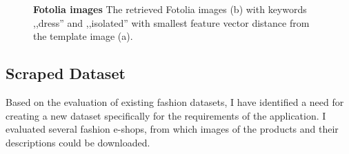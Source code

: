 \documentclass[12pt]{report}
\begin{document}
\begin{figure}[t]
\centering
{}\hspace{1cm}
\caption{\label{fig:fotolia} \textbf{Fotolia images} The retrieved Fotolia images (b) with keywords ,,dress'' and ,,isolated'' with smallest feature vector distance from the template image (a).}
\end{figure}

\pagebreak
\subsection{Scraped Dataset}
Based on the evaluation of existing fashion datasets, I have identified a need for creating a new dataset specifically for the requirements of the application. I evaluated several fashion e-shops, from which images of the products and their descriptions could be downloaded. 
\end{document}
